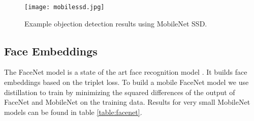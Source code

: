 \documentclass[10pt,twocolumn,letterpaper]{article}
\begin{document}
\begin{table}[t]
\setlength\tabcolsep{3pt}
  \caption{COCO object detection results comparison using different frameworks and network architectures. mAP is reported with COCO primary challenge metric (AP at IoU=0.50:0.05:0.95)} \centering {}
\label{table:objectdetection} \end{table}

\begin{figure}
  \texttt{[image: mobilessd.jpg]}
  \caption{Example objection detection results using MobileNet SSD.}
  \label{fig:detection}
\end{figure}

\subsection{Face Embeddings}
The FaceNet model is a state of the art face recognition model \cite{schroff2015facenet}. It builds face embeddings based on the triplet loss. To build a mobile FaceNet model we use distillation
to train by minimizing the squared differences of the output of FaceNet and MobileNet on the training data. Results for very small MobileNet models can be found in table \ref{table:facenet}.
\end{document}

